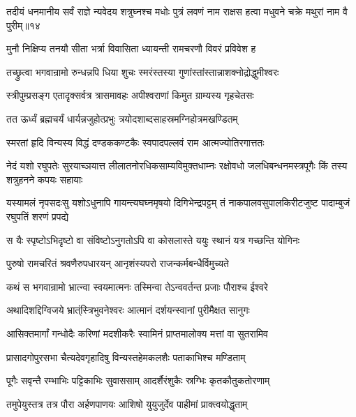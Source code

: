 \threelineshloka
{तदीयं धनमानीय सर्वं राज्ञे न्यवेदय}
{शत्रुघ्नश्च मधोः पुत्रं लवणं नाम राक्षस}
{हत्वा मधुवने चक्रे मथुरां नाम वै पुरीम्॥१४} %

\twolineshloka
{मुनौ निक्षिप्य तनयौ सीता भर्त्रा विवासिता}
{ध्यायन्ती रामचरणौ विवरं प्रविवेश ह} %

\twolineshloka
{तच्छ्रुत्वा भगवान्रामो रुन्धन्नपि धिया शुचः}
{स्मरंस्तस्या गुणांस्तांस्तान्नाशक्नोद्रोद्धुमीश्वरः} %

\twolineshloka
{स्त्रीपुम्प्रसङ्ग एतादृक्सर्वत्र त्रासमावहः}
{अपीश्वराणां किमुत ग्राम्यस्य गृहचेतसः} %

\twolineshloka
{तत ऊर्ध्वं ब्रह्मचर्यं धार्यन्नजुहोत्प्रभुः}
{त्रयोदशाब्दसाहस्रमग्निहोत्रमखण्डितम्} %

\twolineshloka
{स्मरतां हृदि विन्यस्य विद्धं दण्डककण्टकैः}
{स्वपादपल्लवं राम आत्मज्योतिरगात्ततः} %

\fourlineindentedshloka
{नेदं यशो रघुपतेः सुरयाच्ञयात्त}
{लीलातनोरधिकसाम्यविमुक्तधाम्नः}
{रक्षोवधो जलधिबन्धनमस्त्रपूगैः}
{किं तस्य शत्रुहनने कपयः सहायाः} %

\fourlineindentedshloka
{यस्यामलं नृपसदःसु यशोऽधुनापि}
{गायन्त्यघघ्नमृषयो दिगिभेन्द्रपट्टम्}
{तं नाकपालवसुपालकिरीटजुष्ट}
{पादाम्बुजं रघुपतिं शरणं प्रपद्ये} %

\twolineshloka
{स यैः स्पृष्टोऽभिदृष्टो वा संविष्टोऽनुगतोऽपि वा}
{कोसलास्ते ययुः स्थानं यत्र गच्छन्ति योगिनः} %

\twolineshloka
{पुरुषो रामचरितं श्रवणैरुपधारयन्}
{आनृशंस्यपरो राजन्कर्मबन्धैर्विमुच्यते} %



\twolineshloka
{कथं स भगवान्रामो भ्रात्न्वा स्वयमात्मनः}
{तस्मिन्वा तेऽन्ववर्तन्त प्रजाः पौराश्च ईश्वरे} %



\twolineshloka
{अथादिशद्दिग्विजये भ्रात्ंस्त्रिभुवनेश्वरः}
{आत्मानं दर्शयन्स्वानां पुरीमैक्षत सानुगः} %

\twolineshloka
{आसिक्तमार्गां गन्धोदैः करिणां मदशीकरैः}
{स्वामिनं प्राप्तमालोक्य मत्तां वा सुतरामिव} %

\twolineshloka
{प्रासादगोपुरसभा चैत्यदेवगृहादिषु}
{विन्यस्तहेमकलशैः पताकाभिश्च मण्डिताम्} %

\twolineshloka
{पूगैः सवृन्तै रम्भाभिः पट्टिकाभिः सुवाससाम्}
{आदर्शैरंशुकैः स्रग्भिः कृतकौतुकतोरणाम्} %

\twolineshloka
{तमुपेयुस्तत्र तत्र पौरा अर्हणपाणयः}
{आशिषो युयुजुर्देव पाहीमां प्राक्त्वयोद्धृताम्} %

